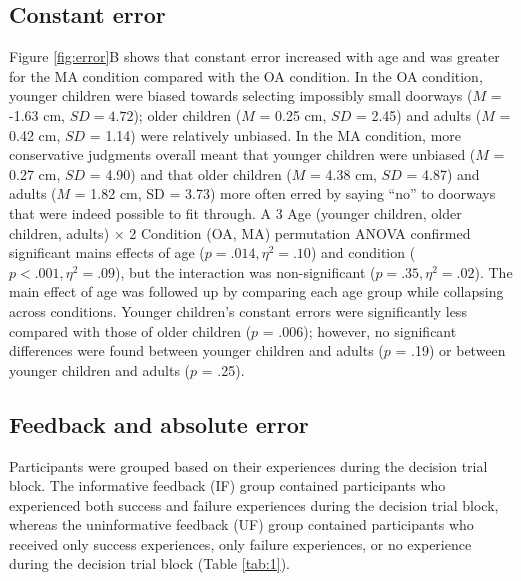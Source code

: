 \documentclass[a4paper,man,natbib,floatsintext,noextraspace]{apa6}
\begin{document}
\subsection{Constant error}

Figure \ref{fig:error}B shows that constant error increased with age and was greater for the MA condition compared with the OA condition. In the OA condition, younger children were biased towards selecting impossibly small doorways ($M$ = -1.63 cm, $SD = 4.72$); older children ($M$ = 0.25 cm, $SD$ = 2.45) and adults ($M$ = 0.42 cm, $SD$ = 1.14) were relatively unbiased. In the MA condition, more conservative judgments overall meant that younger children were unbiased ($M$ = 0.27 cm, $SD$ = 4.90) and that older children ($M$ = 4.38 cm, $SD$ = 4.87) and adults ($M$ = 1.82 cm, SD = 3.73) more often erred by saying “no” to doorways that were indeed possible to fit through. A 3 Age (younger children, older children, adults) × 2 Condition (OA, MA) permutation ANOVA confirmed significant mains effects of age ($p = .014, \eta^{2} = .10$) and condition ($p < .001, \eta^{2} = .09$), but the interaction was non-significant ($p = .35, \eta^{2} = .02$). The main effect of age was followed up by comparing each age group while collapsing across conditions. Younger children’s constant errors were significantly less compared with those of older children ($p$ = .006); however, no significant differences were found between younger children and adults ($p$ = .19) or between younger children and adults ($p$ = .25).

\subsection{Feedback and absolute error}

Participants were grouped based on their experiences during the decision trial block. The informative feedback (IF) group contained participants who experienced both success and failure experiences during the decision trial block, whereas the uninformative feedback (UF) group contained participants who received only success experiences, only failure experiences, or no experience during the decision trial block (Table \ref{tab:1}). 
\end{document}
